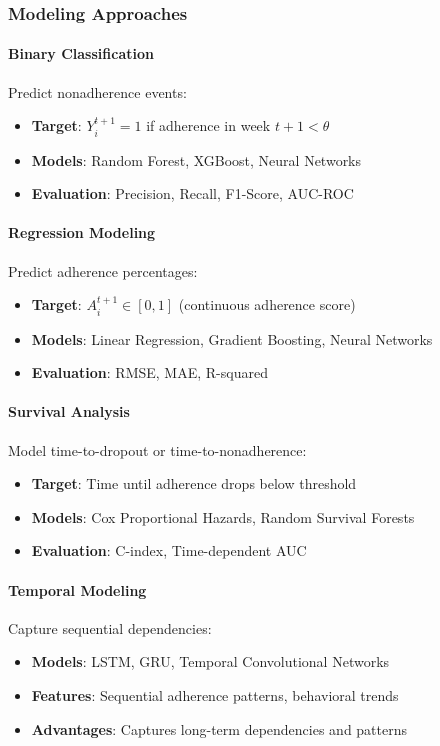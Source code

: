 \documentclass[12pt]{article}
\begin{document}
\subsubsection{Modeling Approaches}

\paragraph{Binary Classification}
Predict nonadherence events:
\begin{itemize}
    \item \textbf{Target}: $Y_i^{t+1} = 1$ if adherence in week $t+1 < \theta$
    \item \textbf{Models}: Random Forest, XGBoost, Neural Networks
    \item \textbf{Evaluation}: Precision, Recall, F1-Score, AUC-ROC
\end{itemize}

\paragraph{Regression Modeling}
Predict adherence percentages:
\begin{itemize}
    \item \textbf{Target}: $A_i^{t+1} \in [0,1]$ (continuous adherence score)
    \item \textbf{Models}: Linear Regression, Gradient Boosting, Neural Networks
    \item \textbf{Evaluation}: RMSE, MAE, R-squared
\end{itemize}

\paragraph{Survival Analysis}
Model time-to-dropout or time-to-nonadherence:
\begin{itemize}
    \item \textbf{Target}: Time until adherence drops below threshold
    \item \textbf{Models}: Cox Proportional Hazards, Random Survival Forests
    \item \textbf{Evaluation}: C-index, Time-dependent AUC
\end{itemize}

\paragraph{Temporal Modeling}
Capture sequential dependencies:
\begin{itemize}
    \item \textbf{Models}: LSTM, GRU, Temporal Convolutional Networks
    \item \textbf{Features}: Sequential adherence patterns, behavioral trends
    \item \textbf{Advantages}: Captures long-term dependencies and patterns
\end{itemize}
\end{document}
